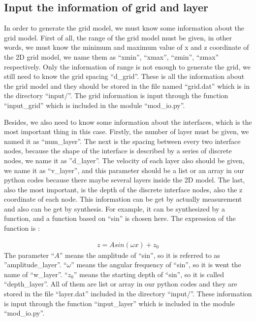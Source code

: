 %
%
%
%
%

\subsection{Input the information of grid and layer}
In order to generate the grid model, we must know some information about the grid model. 
First of all, the range of the grid model must be given, in other words, we must know the 
minimum and maximum value of x and z coordinate of the 2D grid model, we name them as 
``xmin'', ``xmax'', ``zmin'', ``zmax'' respectively. Only the information of range is not 
enough to generate the grid, we still need to know the grid spacing ``d\_grid''. These is 
all the information about the grid model and they should be stored in the file named 
``grid.dat'' which is in the directory ``input/''. The grid information is input through 
the function ``input\_grid'' which is included in the module ``mod\_io.py''.\par

Besides, we also need to know some information about the interfaces, which is the most 
important thing in this case. Firstly, the number of layer must be given, we named it as 
``num\_layer''. The next is the spacing between every two interface nodes, because the shape 
of the interface is described by a series of discrete nodes, we name it as ''d\_layer''.
The velocity of each layer also should be given, we name it as ``v\_layer'', and this parameter
should be a list or an array in our python codes because there maybe several layers inside
the 2D model. The last, also the most important, is the depth of the discrete interface nodes,
also the z coordinate of each node. This information can be get by actually measurement and
also can be get by synthesis. For example, it can be synthesized by a function, and a 
function based on ``sin'' is chosen here. The expression of the function is : \par
\begin{align}
    z = A sin(\omega x) + z_0
\end{align}
The parameter ``$A$'' means the amplitude of ``sin'', so it is referred to as 
''amplitude\_layer''. ``$\omega$'' means the angular frequency of ``sin'', so it is went
the name of ``w\_layer''. ``$z_0$'' means the starting depth of ``sin'', so it is called
``depth\_layer''. All of them are list or array in our python codes and they are stored in
the file ``layer.dat'' included in the directory ``input/''. These information is input
through the function ``input\_layer'' which is included in the module ``mod\_io.py''. \\[5pt]

